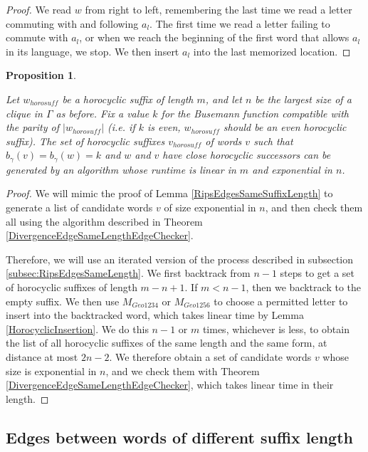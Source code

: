 \documentclass{amsart}
\newtheorem{proposition}[theorem]{Proposition}
\theoremstyle{definition}
\theoremstyle{remark}
\begin{document}
	\begin{proof}
		
		We read $w$ from right to left, remembering the last time we read a letter commuting with and following $a_l$. The first time we read a letter failing to commute with $a_l$, or when we reach the beginning of the first word that allows $a_l$ in its language, we stop. We then insert $a_l$ into the last memorized location.	
	\end{proof}
	
	\begin{proposition} \label{DivergenceGraphSameSuffixLengthEdgeGenerator}
		
		Let $w_{horosuff}$ be a horocyclic suffix of length $m$, and let $n$ be the largest size of a clique in $\Gamma$ as before. Fix a value $k$ for the Busemann function compatible with the parity of $|w_{horosuff}|$ (i.e. if $k$ is even, $w_{horosuff}$ should be an even horocyclic suffix). The set of horocyclic suffixes $v_{horosuff}$ of words $v$ such that $b_\gamma(v)=b_\gamma(w)=k$ and $w$ and $v$ have close horocyclic successors can be generated by an algorithm whose runtime is linear in $m$ and exponential in $n$.
	\end{proposition}
	
	\begin{proof}
		
		We will mimic the proof of Lemma \ref{RipsEdgesSameSuffixLength} to generate a list of candidate words $v$ of size exponential in $n$, and then check them all using the algorithm described in Theorem \ref{DivergenceEdgeSameLengthEdgeChecker}.
		
		Therefore, we will use an iterated version of the process described in subsection \ref{subsec:RipsEdgesSameLength}. We first backtrack from $n-1$ steps to get a set of horocyclic suffixes of length $m-n+1$. If $m<n-1$, then we backtrack to the empty suffix. We then use $M_{Geo1234}$ or $M_{Geo1256}$ to choose a permitted letter to insert into the backtracked word, which takes linear time by Lemma \ref{HorocyclicInsertion}. We do this $n-1$ or $m$ times, whichever is less, to obtain the list of all horocyclic suffixes of the same length and the same form, at distance at most $2n-2$. We therefore obtain a set of candidate words $v$ whose size is exponential in $n$, and we check them with Theorem \ref{DivergenceEdgeSameLengthEdgeChecker}, which takes linear time in their length.
	\end{proof}
	
	
	\subsection{Edges between words of different suffix length}
	\label{subsec:DivergenceEdgesDifferenLength}
	
\end{document}
